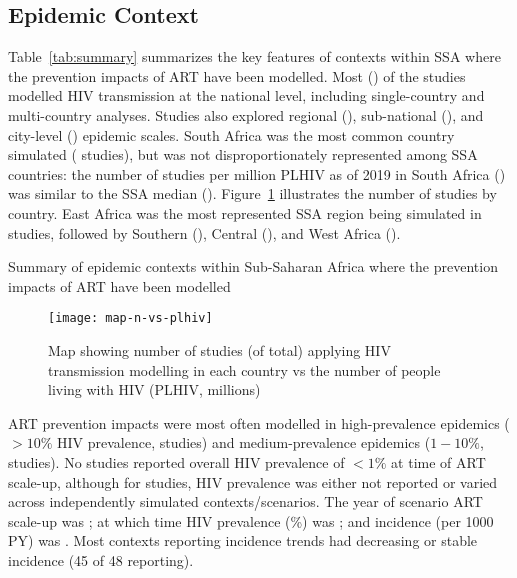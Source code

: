 \subsection{Epidemic Context}
\label{ss:res:context}
Table~\ref{tab:summary} summarizes the key features of contexts within SSA
where the prevention impacts of ART have been modelled.
Most () of the \na studies modelled HIV transmission at the national level,
including  single-country and  multi-country analyses.
Studies also explored
regional (),
sub-national (), and
city-level () epidemic scales.
South Africa was the most common country simulated ( studies),
but was not disproportionately represented among SSA countries:
the number of studies per million PLHIV as of 2019 in South Africa ()
was similar to the SSA median ().
Figure~\ref{fig:map} illustrates the number of studies by country.
East Africa was the most represented SSA region being simulated in  studies,
followed by Southern (), Central (), and West Africa ().
\begin{table}
  \centering
  \caption{Summary of epidemic contexts within Sub-Saharan Africa where
    the prevention impacts of ART have been modelled}
  \label{tab:summary}
  
\end{table}
\begin{figure}[h]
  \centering
  \texttt{[image: map-n-vs-plhiv]}
  \caption{Map showing number of studies (of \na total)
    applying HIV transmission modelling in each country vs
    the number of people living with HIV (PLHIV, millions)}
  \label{fig:map}
\end{figure}
\par
ART prevention impacts were most often modelled in
high-prevalence epidemics (${>10\%}$ HIV prevalence,  studies) and
medium-prevalence epidemics (${1-10\%}$,  studies).
No studies reported overall HIV prevalence of ${<1\%}$ at time of ART scale-up,
although for  studies, HIV prevalence was either
not reported or varied across independently simulated contexts/scenarios.
The \xdmdef year of scenario ART scale-up was ; at which time
HIV prevalence (\%) was ; and
incidence (per 1000 PY) was .
Most contexts reporting incidence trends had decreasing or stable incidence
(45 of 48 reporting). %
